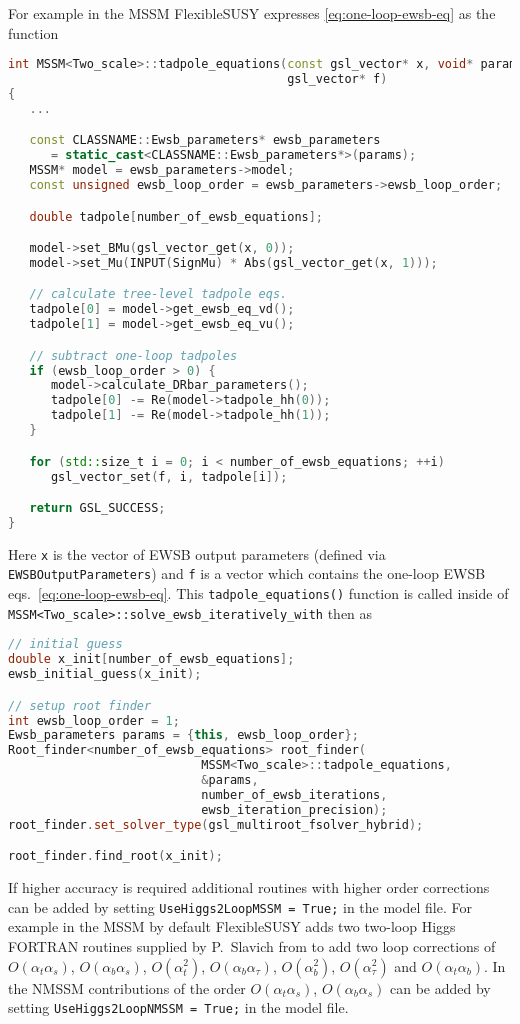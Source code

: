 \documentclass[final,3p,11pt,pdflatex]{elsarticle}
\makeatletter
\newcommand{\fs}{FlexibleSUSY\@\xspace}
\newcommand{\code}[1]{\lstinline|#1|}  %
\def\at{\alpha_t}
\def\ab{\alpha_b}
\def\as{\alpha_s}
\def\atau{\alpha_{\tau}}
\def\oatab{O(\at\ab)}
\def\oatas{O(\at\as)}
\def\oabas{O(\ab\as)}
\def\oatq{O(\at^2)}
\def\oabq{O(\ab^2)}
\def\oatauq{O(\atau^2)}
\def\oabatau{O(\ab \atau)}
\makeatother
\begin{document}
For example in the MSSM \fs expresses \eqref{eq:one-loop-ewsb-eq} as
the function
%
\begin{lstlisting}[language=C++]
int MSSM<Two_scale>::tadpole_equations(const gsl_vector* x, void* params,
                                       gsl_vector* f)
{
   ...

   const CLASSNAME::Ewsb_parameters* ewsb_parameters
      = static_cast<CLASSNAME::Ewsb_parameters*>(params);
   MSSM* model = ewsb_parameters->model;
   const unsigned ewsb_loop_order = ewsb_parameters->ewsb_loop_order;

   double tadpole[number_of_ewsb_equations];

   model->set_BMu(gsl_vector_get(x, 0));
   model->set_Mu(INPUT(SignMu) * Abs(gsl_vector_get(x, 1)));

   // calculate tree-level tadpole eqs.
   tadpole[0] = model->get_ewsb_eq_vd();
   tadpole[1] = model->get_ewsb_eq_vu();

   // subtract one-loop tadpoles
   if (ewsb_loop_order > 0) {
      model->calculate_DRbar_parameters();
      tadpole[0] -= Re(model->tadpole_hh(0));
      tadpole[1] -= Re(model->tadpole_hh(1));
   }

   for (std::size_t i = 0; i < number_of_ewsb_equations; ++i)
      gsl_vector_set(f, i, tadpole[i]);

   return GSL_SUCCESS;
}
\end{lstlisting}
%
Here \code{x} is the vector of EWSB output parameters (defined via
\code{EWSBOutputParameters}) and \code{f} is a vector which contains
the one-loop EWSB eqs.\ \eqref{eq:one-loop-ewsb-eq}.  This
\code{tadpole_equations()} function is called inside of
\code{MSSM<Two_scale>::solve_ewsb_iteratively_with} then as
%
\begin{lstlisting}[language=C++]
// initial guess
double x_init[number_of_ewsb_equations];
ewsb_initial_guess(x_init);

// setup root finder
int ewsb_loop_order = 1;
Ewsb_parameters params = {this, ewsb_loop_order};
Root_finder<number_of_ewsb_equations> root_finder(
                           MSSM<Two_scale>::tadpole_equations,
                           &params,
                           number_of_ewsb_iterations,
                           ewsb_iteration_precision);
root_finder.set_solver_type(gsl_multiroot_fsolver_hybrid);

root_finder.find_root(x_init);
\end{lstlisting}

If higher accuracy is required additional routines with higher order
corrections can be added by setting \code{UseHiggs2LoopMSSM = True;}
in the model file.  For example in the MSSM by default \fs adds two
two-loop Higgs FORTRAN routines supplied by P.~Slavich from
\cite{Degrassi:2001yf,Brignole:2001jy,Dedes:2002dy,Brignole:2002bz,Dedes:2003km}
to add two loop corrections of $\oatas$, $\oabas$, $\oatq$,
$\oabatau$, $\oabq$, $\oatauq$ and $\oatab$.  In the NMSSM
contributions of the order $\oatas$, $\oabas$ \cite{Degrassi:2009yq}
can be added by setting \code{UseHiggs2LoopNMSSM = True;} in the model
file.
\end{document}
